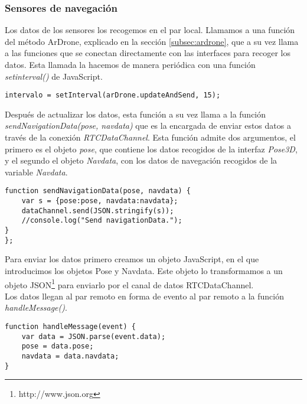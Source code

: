 \subsubsection{Sensores de navegación}

Los datos de los sensores los recogemos en el par local. Llamamos a una función del método ArDrone, explicado en la sección \ref{subsec:ardrone}, que a su vez llama a las funciones que se conectan directamente con las interfaces para recoger los datos. Esta llamada la hacemos de manera periódica con una función \emph{setinterval()} de JavaScript.\\

\begin{lstlisting}[caption=Intervalo actualización y envío de datos de los sensores.]
intervalo = setInterval(arDrone.updateAndSend, 15);
\end{lstlisting}

Después de actualizar los datos, esta función a su vez llama a la función \emph{sendNavigationData(pose, navdata)} que es la encargada de enviar estos datos a través de la conexión \emph{RTCDataChannel}. Esta función admite dos argumentos, el primero es el objeto \emph{pose}, que contiene los datos recogidos de la interfaz \emph{Pose3D}, y el segundo el objeto \emph{Navdata}, con los datos de navegación recogidos de la variable \emph{Navdata}.\\

\begin{lstlisting}[caption=Envio de los datos de los sensores en el par local.]
function sendNavigationData(pose, navdata) {
	var s = {pose:pose, navdata:navdata};
	dataChannel.send(JSON.stringify(s));
	//console.log("Send navigationData.");
}
};\end{lstlisting}

Para enviar los datos primero creamos un objeto JavaScript, en el que introducimos los objetos Pose y Navdata. Este objeto lo transformamos a un objeto JSON\footnote{http://www.json.org} para enviarlo por el canal de datos RTCDataChannel.\\

Los datos llegan al par remoto en forma de evento al par remoto a la función \emph{handleMessage()}.\\

\begin{lstlisting}[caption=Manejo de los datos de los sensores en el par remoto.]
function handleMessage(event) {
    var data = JSON.parse(event.data);
    pose = data.pose;
    navdata = data.navdata;
}
\end{lstlisting}

